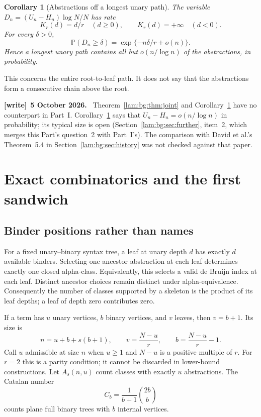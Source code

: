 \documentclass[11pt,a4paper]{article}
\numberwithin{equation}{section}
\newtheorem{corollary}[theorem]{Corollary}
\theoremstyle{remark}
\newcommand{\Prob}{\mathbb P}
\newenvironment{writenote}[1][]{\par\smallskip\begingroup\small
 \noindent\textbf{[write]}\if\relax\detokenize{#1}\relax\else~\textbf{#1.}\fi\ }%
 {\par\endgroup\smallskip}
\begin{document}
\begin{corollary}[Abstractions off a longest unary path]\label{lam:bg:cor:deficit}
The variable $D_n=(U_n-H_n)\log N/N$ has rate
\[
 K_r(d)=d/r\quad(d\ge0),\qquad K_r(d)=+\infty\quad(d<0).
\]
For every $\delta>0$,
\begin{equation}\label{lam:bg:eq:deficit-tail}
 \Prob(D_n\ge\delta)=\exp\{-n\delta/r+o(n)\}.
\end{equation}
Hence a longest unary path contains all but $o(n/\log n)$ of the abstractions, in probability.
\end{corollary}
This concerns the entire root-to-leaf path. It does not say that the abstractions form a consecutive chain above the root.
\begin{writenote}[5 October 2026]
Theorem~\ref{lam:bg:thm:joint} and Corollary~\ref{lam:bg:cor:deficit} have no counterpart in Part~I. Corollary~\ref{lam:bg:cor:deficit} says that $U_n-H_n=o(n/\log n)$ in probability; its typical size is open (Section~\ref{lam:bg:sec:further}, item~2, which merges this Part's question~2 with Part~I's). The comparison with David et al.'s Theorem~5.4 in Section~\ref{lam:bg:sec:history} was not checked against that paper.
\end{writenote}

\section{Exact combinatorics and the first sandwich}\label{lam:bg:sec:skeleton}

\subsection{Binder positions rather than names}
For a fixed unary--binary syntax tree, a leaf at unary depth $d$ has exactly $d$ available binders. Selecting one ancestor abstraction at each leaf determines exactly one closed alpha-class. Equivalently, this selects a valid de Bruijn index at each leaf. Distinct ancestor choices remain distinct under alpha-equivalence. Consequently the number of classes supported by a skeleton is the product of its leaf depths; a leaf of depth zero contributes zero.

If a term has $u$ unary vertices, $b$ binary vertices, and $v$ leaves, then $v=b+1$. Its size is
\begin{equation}\label{lam:bg:eq:size}
 n=u+b+s(b+1),\qquad v=\frac{N-u}{r},\qquad
 b=\frac{N-u}{r}-1.
\end{equation}
Call $u$ admissible at size $n$ when $u\ge1$ and $N-u$ is a positive multiple of $r$. For $r=2$ this is a parity condition; it cannot be discarded in lower-bound constructions. Let $A_s(n,u)$ count classes with exactly $u$ abstractions. The Catalan number
\[
 C_b=\frac1{b+1}\binom{2b}{b}
\]
counts plane full binary trees with $b$ internal vertices.
\end{document}
